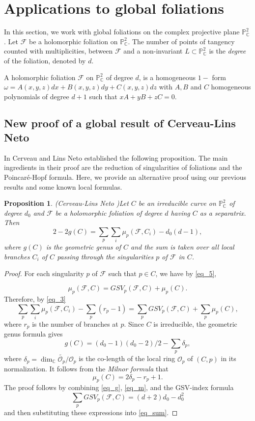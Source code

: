 \documentclass[11pt]{amsart}
\newcommand{\C}{\mathbb{C}}
\newcommand{\F}{\mathcal{F}}
\newtheorem{proposition}[theorem]{Proposition}
\begin{document}
\section{Applications to global foliations}\label{applications}
In this section, we work with global foliations on the complex projective plane $\mathbb{P}^2_\C$. Let $\F$ be a holomorphic foliation on $\mathbb{P}^2_\C$. The number of points of tangency counted with multiplicities, between $\F$ and a non-invariant $L\subset\mathbb{P}^2_\C$ is the \textit{degree} of the foliation, denoted by $d$. 
\par A holomorphic foliation $\F$ on $\mathbb{P}^2_\C$ of degree $d$, is a homogeneous $1-$ form $\omega=A(x,y,z)dx+B(x,y,z)dy+C(x,y,z)dz$ with $A, B$ and $C$ homogeneous polynomials of degree $d+1$ such that $xA+yB+zC=0$.


\subsection{New proof of a global result of Cerveau-Lins Neto}
In \cite[p. 885]{Cerveau-LN} Cerveau and Lins Neto established the following proposition. The main ingredients in their proof are the reduction of singularities of foliations and the Poincar\'e-Hopf formula. Here, we provide an alternative proof using our previous results and some known local formulas. 
\begin{proposition}(Cerveau-Lins Neto \cite{Cerveau-LN})\label{prop_cl}
Let $C$ be an irreducible curve on $\mathbb{P}^2_\C$ of degree $d_0$ and $\F$ be a holomorphic foliation of degree $d$ having $C$ as a separatrix. Then
\[2-2g(C)=\sum_p\sum_i\mu_p(\F,C_i)-d_0(d-1),\]
where $g(C)$ is the geometric genus of $C$ and the sum is taken over all local branches $C_i$ of $C$ passing through the singularities $p$ of $\F$ in $C$. 
\end{proposition}
\begin{proof}
For each singularity $p$ of $\F$ such that $p\in C$, we have by \eqref{eq_5},

\[\mu_p(\F,C)=GSV_p(\F,C)+\mu_p(C).\] 
Therefore, by \eqref{eq_3}
\begin{equation}\label{eq_sum}
\sum_p\sum_i\mu_p(\F,C_i)-\sum_p(r_p-1)=\sum_p GSV_p(\F,C)+\sum_p \mu_p(C),
\end{equation}
 where $r_p$ is the number of branches at $p$.
Since $C$ is irreducible, the geometric genus formula  gives
\begin{equation}\label{eq_g}
g(C)=(d_0-1)(d_0-2)/2-\sum_p \delta_p,
\end{equation}
where $\delta_p=\dim_\C\widetilde{\mathcal{O}_p}/\mathcal{O}_p$ is the co-length of the local ring $\mathcal{O}_p$ of $(C,p)$ in its normalization. It follows from the \textit{Milnor formula} \cite[Theorem 10.5]{milnor} that
\begin{equation}\label{eq_m}
\mu_p(C)=2\delta_p-r_p+1.
\end{equation}
 The proof follows by combining \eqref{eq_g}, \eqref{eq_m}, and the GSV-index formula \cite[Proposition 2.3]{Brunella-book}
\[\sum_p GSV_p(\F,C)=(d+2)d_0-d_0^2\]
and then substituting these expressions into \eqref{eq_sum}.
\end{proof}
\end{document}
